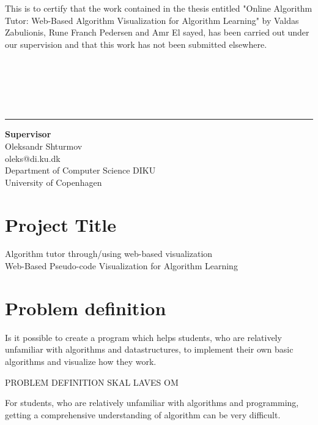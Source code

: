\documentclass[11pt]{article}
\begin{document}
This is to certify that the work contained in the thesis entitled "Online Algorithm Tutor: Web-Based Algorithm Visualization for Algorithm Learning" by Valdas Zabulionis, Rune Franch Pedersen and Amr El sayed, has been carried out under our supervision and that this work has not been submitted elsewhere.\\\\\\\\\\\\
\begin{center}\noindent\rule{8cm}{0.4pt}%

\begin{center}
\textbf{Supervisor}\\
Oleksandr Shturmov \\
oleks@di.ku.dk \\
Department of Computer Science DIKU \\
University of Copenhagen
\end{center}
\newpage
\tableofcontents
\end{center}
\newpage
\section*{Project Title}
Algorithm tutor through/using web-based visualization\\
Web-Based Pseudo-code Visualization for Algorithm Learning

\section*{Problem definition}
Is it possible to create a program which helps students, who are relatively unfamiliar with algorithms and datastructures, to implement their own basic algorithms and visualize how they work.

PROBLEM DEFINITION SKAL LAVES OM

For students, who are relatively unfamiliar with algorithms and programming, getting a comprehensive understanding of algorithm can be very difficult.\\
\end{document}
